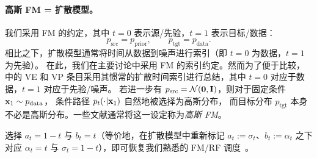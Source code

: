 \paragraph{高斯 FM = 扩散模型。}
我们采用 FM 的约定，其中 $t=0$ 表示源/先验，$t=1$ 表示目标/数据：
\[
p_{\mathrm{src}}=p_{\mathrm{prior}},\qquad p_{\mathrm{tgt}}=p_{\mathrm{data}}.
\]
相比之下，扩散模型通常将时间从数据到噪声进行索引（即 $t=0$ 为数据，$t=1$ 为先验）。
在此，我们在主要讨论中采用 FM 的索引约定。然而为了便于比较， 中的 VE 和 VP 条目采用其惯常的扩散时间索引进行总结，其中 $t=0$ 对应于数据，$t=1$ 对应于先验/噪声。
若进一步有 $p_{\mathrm{src}}=\mathcal N(\bm 0,{\mathbf{I}})$，则对于固定条件 ${\mathbf{x}}_1\sim p_{\mathrm{data}}$，
条件路径 $p_t(\cdot |{\mathbf{x}}_1)$ 自然地被选择为高斯分布，
而目标分布 $p_{\mathrm{tgt}}$ 本身不必是高斯分布。一些文献通常将这一设定称为\emph{高斯 FM}。



选择 $a_t = 1-t$ 与 $b_t = t$（等价地，在扩散模型中重新标记 $a_t:=\sigma_t$、$b_t:=\alpha_t$ 之下对应 $\alpha_t = t$ 与 $\sigma_t = 1-t$），即可恢复我们熟悉的 FM/RF 调度~\citep{lipman2022flow,liu2022rectified}。


\begin{table}[th]
\caption{不同插值元写为 $\rvx_t = a_t \rvx_0 + b_t \rvx_1$ 的总结，其中
  $\rvx_0 \sim p_{\mathrm{src}}=p_{\mathrm{prior}}$，
  $\rvx_1 \sim p_{\mathrm{tgt}}=p_{\mathrm{data}}$。
  FM/RF 与三角列采用 FM 约定（$t=0$ 为源，$t=1$ 为目标）。
  为便于比较，VE/VP 列保留其惯常的扩散时间索引（$t=0$ 为数据，$t=1$ 为先验/噪声），系数名称重新标记为 $a_t:=\sigma_t$ 与 $b_t:=\alpha_t$。}
  \small
  \centering
  \label{tb:interpolant_instances}
\end{table}



